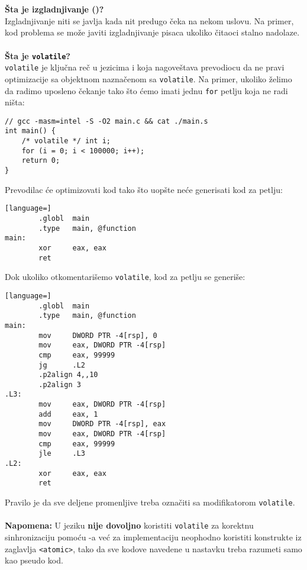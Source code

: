 \\\\
\textbf{\v{S}ta je izgladnjivanje ()?}\\
Izgladnjivanje niti se javlja kada nit predugo \v{c}eka na nekom uslovu. Na primer, kod  problema se mo\v{z}e javiti izgladnjivanje pisaca ukoliko \v{c}itaoci stalno nadolaze.
\\\\
\textbf{\v{S}ta je \texttt{volatile}?}\\
\texttt{volatile} je klju\v{c}na re\v{c} u jezicima  i  koja nagove\v{s}tava prevodiocu da ne pravi optimizacije sa objektnom nazna\v{c}enom sa \texttt{volatile}.
Na primer, ukoliko \v{z}elimo da radimo uposleno \v{c}ekanje tako \v{s}to \'{c}emo imati jednu \texttt{for} petlju koja ne radi ni\v{s}ta:
\begin{lstlisting}
// gcc -masm=intel -S -O2 main.c && cat ./main.s
int main() {
    /* volatile */ int i;
    for (i = 0; i < 100000; i++);
    return 0;
}
\end{lstlisting}
Prevodilac \'{c}e optimizovati kod tako \v{s}to uop\v{s}te ne\'{c}e generisati kod za petlju:
\begin{lstlisting}[language=]
        .globl  main
        .type   main, @function
main:
        xor     eax, eax
        ret
\end{lstlisting}
Dok ukoliko otkomentari\v{s}emo \texttt{volatile}, kod za petlju se generi\v{s}e:
\begin{lstlisting}[language=]
        .globl  main
        .type   main, @function
main:
        mov     DWORD PTR -4[rsp], 0
        mov     eax, DWORD PTR -4[rsp]
        cmp     eax, 99999
        jg      .L2
        .p2align 4,,10
        .p2align 3
.L3:
        mov     eax, DWORD PTR -4[rsp]
        add     eax, 1
        mov     DWORD PTR -4[rsp], eax
        mov     eax, DWORD PTR -4[rsp]
        cmp     eax, 99999
        jle     .L3
.L2:
        xor     eax, eax
        ret
\end{lstlisting}
Pravilo je da sve deljene promenljive treba ozna\v{c}iti sa modifikatorom \texttt{volatile}. 
\\\\
\textbf{Napomena:} U jeziku  \textbf{nije dovoljno} koristiti \texttt{volatile} za korektnu sinhronizaciju pomo\'{c}u -a ve\'{c} za implementaciju neophodno koristiti konstrukte iz zaglavlja \texttt{<atomic>}, tako da sve kodove navedene u nastavku treba razumeti samo kao pseudo kod.
